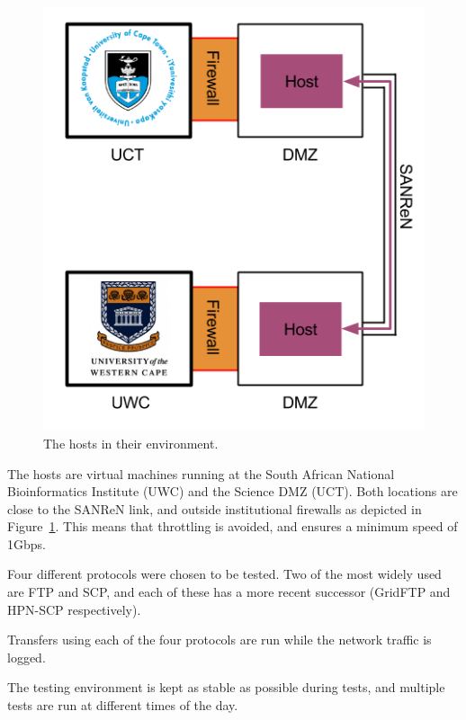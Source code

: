 \documentclass{sig-alternate-05-2015}
\begin{document}
\begin{figure}[t]
\centering
\includegraphics[width=\linewidth]{img/route.png}
\caption{The hosts in their environment.\label{fig:route}}
\end{figure}

The hosts are virtual machines running at the South African National Bioinformatics Institute (UWC) and the Science DMZ (UCT). Both locations are close to the SANReN link, and outside institutional firewalls as depicted in Figure~\ref{fig:route}. This means that throttling is avoided, and ensures a minimum speed of 1Gbps.

Four different protocols were chosen to be tested. Two of the most widely used are FTP and SCP, and each of these has a more recent successor (GridFTP and HPN-SCP respectively).

Transfers using each of the four protocols are run while the network traffic is logged.

The testing environment is kept as stable as possible during tests, and multiple tests are run at different times of the day.
\end{document}
